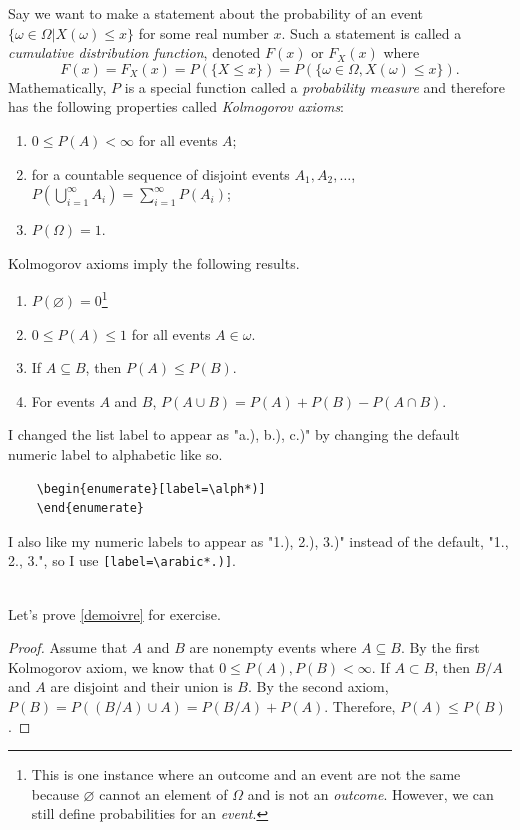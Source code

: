 \documentclass[12pt, notitlepage]{article}
\begin{document}
Say we want to make a statement about the probability of an event $\{\omega \in \Omega | X(\omega) \leq x \}$ for some real number $x$. Such a statement is called a \textit{cumulative distribution function}, denoted $F(x)$ or $F_X(x)$ where 
        $$F(x) = F_X(x) = P(\{X \leq x\}) = P( \{ \omega \in \Omega, X(\omega) \leq x \}).$$ 
Mathematically, $P$ is a special function called a \textit{probability measure} and therefore has the following properties called \textit{Kolmogorov axioms}:
        \begin{enumerate}[label=\arabic*.)]
        \item $0 \leq P(A) < \infty$ for all events $A$;
        \item for a countable sequence of disjoint events $A_1, A_2, \ldots$, $P(\bigcup \limits_{i=1}^\infty A_i) = \sum_{i=1}^\infty P(A_i)$;
        \item $P(\Omega) = 1$.
        \end{enumerate}
Kolmogorov axioms imply the following results.
	\begin{enumerate}[label=\alph*)]
	\item $P(\varnothing) = 0$\footnote{This is one instance where an outcome and an event are not the same because $\varnothing$ cannot an element of $\Omega$ and is not an \textit{outcome}. However, we can still define probabilities for an 		\textit{event}.}
	\item $0 \leq P(A) \leq 1$ for all events $A \in \omega$.
	\item If $A \subseteq B$, then $P(A) \leq P(B)$.
	\item For events $A$ and $B$, $P(A \cup B) = P(A) + P(B) - P(A \cap B)$.  \label{demoivre}
	\end{enumerate}


\begin{notes}
I changed the list label to appear as "a.), b.), c.)" by changing the default numeric label to alphabetic like so.
	\begin{verbatim}
	\begin{enumerate}[label=\alph*)]
	\end{enumerate}
	\end{verbatim}
I also like my numeric labels to appear as "1.), 2.), 3.)" instead of the default, "1., 2., 3.", so I use \verb|[label=\arabic*.)]|.
\end{notes}
\\

Let's prove \ref{demoivre} for exercise. 
\begin{proof}
Assume that $A$ and $B$ are nonempty events where $A \subseteq B$. By the first Kolmogorov axiom, we know that $0 \leq P(A), P(B) < \infty$. If $A \subset B$, then $B/A$ and $A$ are disjoint and their union is $B$. By the second axiom, $P(B) = P((B/A) \cup A) = P(B/A) + P(A)$. Therefore, $P(A) \leq P(B)$.
\end{proof}
\end{document}

